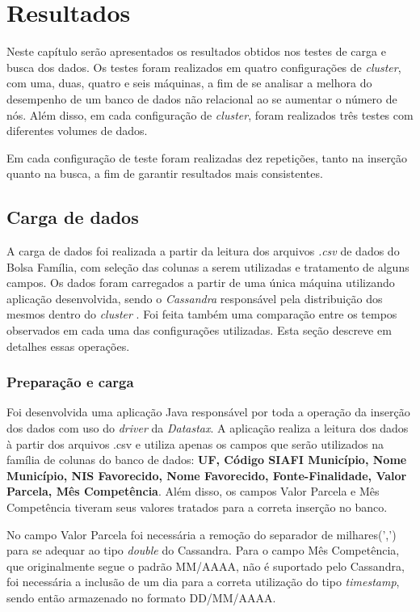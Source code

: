\chapter{Resultados}

Neste capítulo serão apresentados os resultados obtidos nos testes de carga e busca dos dados. Os testes foram realizados em quatro configurações de \emph{cluster}, com uma, duas, quatro e seis máquinas, a fim de se analisar a melhora do desempenho de um banco de dados não relacional ao se aumentar o número de nós. Além disso, em cada configuração de \emph{cluster}, foram realizados três testes com diferentes volumes de dados. 

Em cada configuração de teste foram realizadas dez repetições, tanto na inserção quanto na busca, a fim de garantir resultados mais consistentes. 

\section{Carga de dados}
A carga de dados foi realizada a partir da leitura dos arquivos \emph{.csv} de dados do Bolsa Família, com seleção das colunas a serem utilizadas e tratamento de alguns campos.
Os dados foram carregados a partir de uma única máquina utilizando aplicação desenvolvida, sendo o \emph{Cassandra} responsável pela distribuição dos mesmos dentro do \emph{cluster} . Foi feita também uma comparação entre os tempos observados em cada uma das configurações utilizadas. Esta seção descreve em detalhes essas operações.

\subsection{Preparação e carga}
Foi desenvolvida uma aplicação Java responsável por toda a operação da inserção dos dados com uso do \emph{driver} da \emph{Datastax}. A aplicação realiza a leitura dos dados à partir dos arquivos .csv e utiliza apenas os campos que serão utilizados na família de colunas do banco de dados: \textbf{UF, Código SIAFI Município, Nome Município, NIS Favorecido, Nome Favorecido, Fonte-Finalidade, Valor Parcela, Mês Competência}. Além disso, os campos Valor Parcela e Mês Competência tiveram seus valores tratados para a correta inserção no banco.

No campo Valor Parcela foi necessária a remoção do separador de milhares(',') para se adequar ao tipo \emph{double} do Cassandra. Para o campo Mês Competência, que originalmente segue o padrão MM/AAAA, não é suportado pelo Cassandra, foi necessária a inclusão de um dia para a correta utilização do tipo \emph{timestamp}, sendo então armazenado no formato DD/MM/AAAA.

